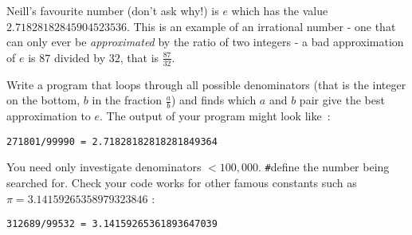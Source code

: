 
Neill's favourite number (don't ask why!) is $e$ which has the value $2.71828182845904523536$. This is an example of an irrational number - one that can only ever be {\it approximated} by the ratio of two integers - a bad approximation of $e$ is $87$ divided by $32$, that is $\frac{87}{32}$.

\begin{exercise}
Write a program that loops through all possible denominators (that is
the integer on the bottom, $b$ in the fraction $\frac{a}{b}$) and finds
which $a$ and $b$ pair give the best approximation to $e$. The output
of your program might look like~:

\begin{verbatim}
271801/99990 = 2.71828182818281849364
\end{verbatim}

You need only investigate denominators $< 100,000$. \verb^#^define
the number being searched for. Check your code works
for other famous constants such as $\pi = 3.14159265358979323846$ :

\begin{verbatim}
312689/99532 = 3.14159265361893647039
\end{verbatim}
\end{exercise}
